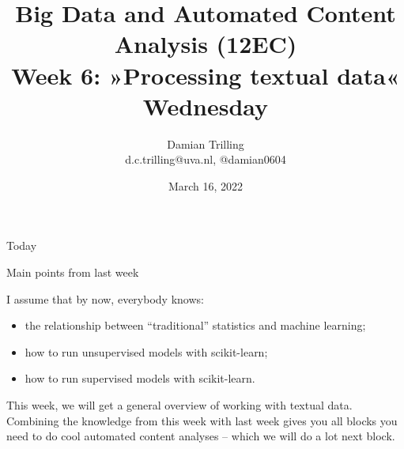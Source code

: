 

\graphicspath{{../../resources/img/}}




\title[Big Data and Automated Content Analysis]{\textbf{Big Data and Automated Content Analysis (12EC)} 
\\Week 6: »Processing textual data«
\\Wednesday}
\author[Damian Trilling]{Damian Trilling\\ \footnotesize{d.c.trilling@uva.nl, @damian0604 \\}}
\date{March 16, 2022}


\begin{frame}{}
	\titlepage
\end{frame}

\begin{frame}{Today}
	\tableofcontents
\end{frame}





\begin{frame}{Main points from last week}

\begin{alertblock}{I assume that by now, everybody knows:}
\begin{itemize}
\item the relationship between ``traditional'' statistics and machine learning;
\item how to run unsupervised models with scikit-learn;
\item how to run supervised models with scikit-learn.
\end{itemize}
\end{alertblock}
\end{frame}


\begin{frame}[standout]
This week, we will get a general overview of working with textual data. Combining the knowledge from this week with last week gives you all blocks you need to do cool automated content analyses -- which we will do a lot next block.
\end{frame}








